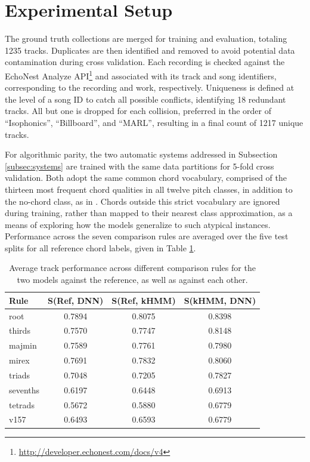 \documentclass{article}
\begin{document}
\section{Experimental Setup}
\label{sec:exp_setup}

The ground truth collections are merged for training and evaluation, totaling 1235 tracks.
Duplicates are then identified and removed to avoid potential data contamination during cross validation.
Each recording is checked against the EchoNest Analyze API\footnote{\url{http://developer.echonest.com/docs/v4}} and associated with its track and song identifiers, corresponding to the recording and work, respectively.
Uniqueness is defined at the level of a song ID to catch all possible conflicts, identifying 18 redundant tracks.
All but one is dropped for each collision, preferred in the order of ``Isophonics'', ``Billboard'', and ``MARL'', resulting in a final count of 1217 unique tracks.

For algorithmic parity, the two automatic systems addressed in Subsection \ref{subsec:systems} are trained with the same data partitions for 5-fold cross validation.
Both adopt the same common chord vocabulary, comprised of the thirteen most frequent chord qualities in all twelve pitch classes, in addition to the no-chord class, as in \cite{Cho2014Improved}.
Chords outside this strict vocabulary are ignored during training, rather than mapped to their nearest class approximation, as a means of exploring how the models generalize to such atypical instances.
Performance across the seven comparison rules are averaged over the five test splits for all reference chord labels, given in Table \ref{tab:test_performance}.

\begin{table}
\scriptsize
\centering
\begin{tabular}{l||cc|c}
Rule      & S(Ref, DNN) & S(Ref, kHMM) & S(kHMM, DNN) \\
\hline
root      & 0.7894      & 0.8075       & 0.8398       \\
thirds    & 0.7570      & 0.7747       & 0.8148       \\
majmin    & 0.7589      & 0.7761       & 0.7980       \\
mirex     & 0.7691      & 0.7832       & 0.8060       \\
triads    & 0.7048      & 0.7205       & 0.7827       \\
sevenths  & 0.6197      & 0.6448       & 0.6913       \\
tetrads   & 0.5672      & 0.5880       & 0.6779       \\
v157      & 0.6493      & 0.6593       & 0.6779       \\


\hline
\end{tabular}
\caption{Average track performance across different comparison rules for the two models against the reference, as well as against each other.}
\label{tab:test_performance}
\end{table}
\end{document}
